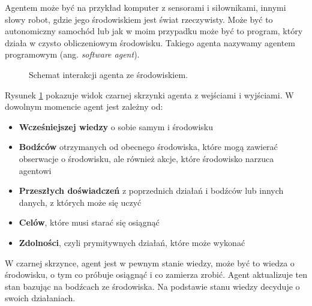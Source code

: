 \documentclass[a4paper, 12pt,oneside]{book}
\begin{document}
Agentem może być na przykład komputer z sensorami i siłownikami, innymi słowy
robot, gdzie jego środowiskiem jest świat rzeczywisty. Może być to autonomiczny
samochód lub jak w moim przypadku może być to program, który
działa w czysto obliczeniowym środowisku. Takiego agenta nazywamy agentem
programowym (ang. \textit{software agent}).
\begin{figure}[!htb] 
\begin{center}
\end{center}
\caption{Schemat interakcji agenta ze środowiskiem.}
\label{rl_figure}
\end{figure}

Rysunek \ref{rl_figure} pokazuje widok czarnej skrzynki agenta z wejściami
i wyjściami. W dowolnym momencie agent jest zależny od:
\begin{itemize}
	\setlength\itemsep{-0.4em}
	\item \textbf{Wcześniejszej wiedzy} o sobie samym i środowisku
	\item \textbf{Bodźców} otrzymanych od obecnego
		środowiska, które mogą zawierać obserwacje o
		środowisku, ale również akcje, które środowisko
		narzuca agentowi
	\item \textbf{Przeszłych doświadczeń} z poprzednich
		działań i bodźców lub innych danych, z których
		może się uczyć
	\item \textbf{Celów}, które musi starać się osiągnąć
	\item \textbf{Zdolności}, czyli prymitywnych działań, które
		może wykonać
\end{itemize}
W czarnej skrzynce, agent jest w pewnym stanie wiedzy, może być to wiedza o
środowisku, o tym co próbuje osiągnąć i co zamierza zrobić. Agent aktualizuje
ten stan bazując na bodźcach ze środowiska. Na podstawie stanu wiedzy decyduje
o swoich działaniach\cite{ai_foundations_agents_situated}.
\end{document}
